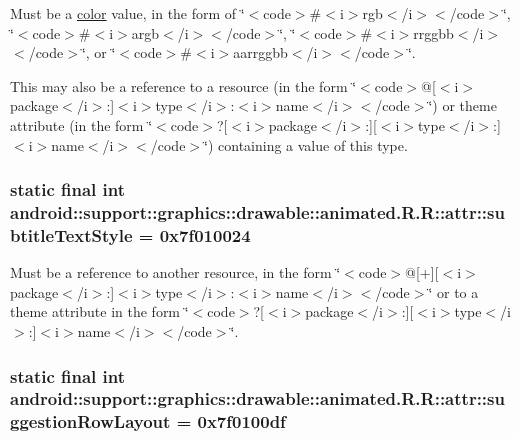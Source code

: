 Must be a \hyperlink{classandroid_1_1support_1_1graphics_1_1drawable_1_1animated_1_1_r_1_1color}{color} value, in the form of \char`\"{}$<$code$>$\#$<$i$>$rgb$<$/i$>$$<$/code$>$\char`\"{}, \char`\"{}$<$code$>$\#$<$i$>$argb$<$/i$>$$<$/code$>$\char`\"{}, \char`\"{}$<$code$>$\#$<$i$>$rrggbb$<$/i$>$$<$/code$>$\char`\"{}, or \char`\"{}$<$code$>$\#$<$i$>$aarrggbb$<$/i$>$$<$/code$>$\char`\"{}. 

This may also be a reference to a resource (in the form \char`\"{}$<$code$>$@\mbox{[}$<$i$>$package$<$/i$>$:\mbox{]}$<$i$>$type$<$/i$>$:$<$i$>$name$<$/i$>$$<$/code$>$\char`\"{}) or theme attribute (in the form \char`\"{}$<$code$>$?\mbox{[}$<$i$>$package$<$/i$>$:\mbox{]}\mbox{[}$<$i$>$type$<$/i$>$:\mbox{]}$<$i$>$name$<$/i$>$$<$/code$>$\char`\"{}) containing a value of this type. \hypertarget{classandroid_1_1support_1_1graphics_1_1drawable_1_1animated_1_1_r_1_1attr_22d0177adb9fcefdff72bb7b55bd8e9e}{
\subsubsection[{subtitleTextStyle}]{\setlength{\rightskip}{0pt plus 5cm}static final int android::support::graphics::drawable::animated.R.R::attr::subtitleTextStyle = 0x7f010024}}
\label{classandroid_1_1support_1_1graphics_1_1drawable_1_1animated_1_1_r_1_1attr_22d0177adb9fcefdff72bb7b55bd8e9e}


Must be a reference to another resource, in the form \char`\"{}$<$code$>$@\mbox{[}+\mbox{]}\mbox{[}$<$i$>$package$<$/i$>$:\mbox{]}$<$i$>$type$<$/i$>$:$<$i$>$name$<$/i$>$$<$/code$>$\char`\"{} or to a theme attribute in the form \char`\"{}$<$code$>$?\mbox{[}$<$i$>$package$<$/i$>$:\mbox{]}\mbox{[}$<$i$>$type$<$/i$>$:\mbox{]}$<$i$>$name$<$/i$>$$<$/code$>$\char`\"{}. \hypertarget{classandroid_1_1support_1_1graphics_1_1drawable_1_1animated_1_1_r_1_1attr_a340ba3cde7d8b5e7d416adb5bdc4822}{
\subsubsection[{suggestionRowLayout}]{\setlength{\rightskip}{0pt plus 5cm}static final int android::support::graphics::drawable::animated.R.R::attr::suggestionRowLayout = 0x7f0100df}}
\label{classandroid_1_1support_1_1graphics_1_1drawable_1_1animated_1_1_r_1_1attr_a340ba3cde7d8b5e7d416adb5bdc4822}


